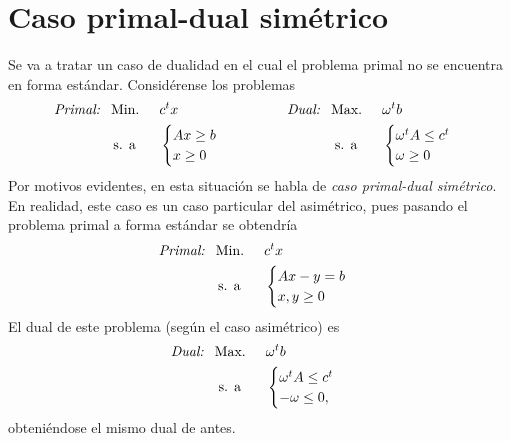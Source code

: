 \documentclass[11pt]{report}
\theoremstyle{mytheorem}
\theoremstyle{mydefinition}
\theoremstyle{myexample}
\begin{document}
\section{Caso primal-dual simétrico}

Se va a tratar un caso de dualidad en el cual el problema primal no se encuentra en forma estándar. Considérense los problemas
\[\begin{aligned}[t]
\textit{\textit{Primal: }} \ &\text{Min. } && c^tx \\
& \, \text{s. a} &&\begin{cases}
    Ax\geq b \\
    x \geq 0 \\
\end{cases}
\end{aligned} \qquad \qquad \begin{aligned}[t]
\textit{\textit{Dual: }} \ &\text{Max. } && \omega^t b \\
& \; \text{s. a} &&\begin{cases}
    \omega^t A \leq c^t \\
    \omega \geq 0
\end{cases}
\end{aligned}\]
Por motivos evidentes, en esta situación se habla de {\textit{caso primal-dual simétrico}}. En realidad, este caso es un caso particular del asimétrico, pues pasando el problema primal a forma estándar se obtendría
\[\begin{aligned}[t]
\textit{\textit{Primal: }} \ &\text{Min. } && c^tx \\
& \, \text{s. a} &&\begin{cases}
    Ax-y = b \\
    x,y \geq 0 \\
\end{cases}
\end{aligned}\]
El dual de este problema (según el caso asimétrico) es
\[\begin{aligned}[t]
\textit{\textit{Dual: }} \ &\textup{Max. } && \omega^t b \\
& \; \textup{s. a} &&\begin{cases}
    \omega^t A \leq c^t \\
    -\omega \leq 0,
\end{cases}
\end{aligned}\]
obteniéndose el mismo dual de antes.
\end{document}
